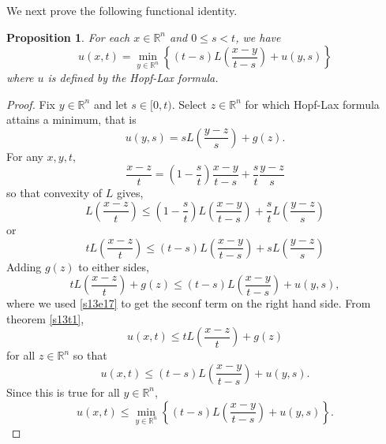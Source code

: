 \documentclass{article}
\theoremstyle{plain}
\numberwithin{thm}{section}
\theoremstyle{plain}
\newtheorem{prop}{Proposition}
\numberwithin{prop}{section}
\theoremstyle{definition}
\numberwithin{defn}{section}
\theoremstyle{remark}
\numberwithin{equation}{section}
\begin{document}
\noindent We next prove the following functional identity.
\begin{prop}\label{s13p6}
For each $x \in \mathbb{R}^n$ and $0 \le s < t$, we have
\[
u(x, t) = \min_{y \in \mathbb{R}^n}\left\{(t - s)L\left(\frac{x - y}{t - s}\right) + u(y, s)\right\}
\]
where $u$ is defined by the Hopf-Lax formula.
\end{prop}
\begin{proof}
Fix $y \in \mathbb{R}^n$ and let $s \in [0, t)$. Select $z \in \mathbb{R}^n$ for which Hopf-Lax
formula attains a minimum, that is
\begin{equation}\label{s13e18}
u(y, s) = sL\left(\frac{y - z}{s}\right) + g(z).
\end{equation}
For any $x, y, t$,
\[
\frac{x - z}{t} = \left(1 - \frac{s}{t}\right)\frac{x - y}{t - s} + \frac{s}{t}\frac{y - z}{s}
\]
so that convexity of $L$ gives,
\[
L\left(\frac{x - z}{t}\right) \le \left(1 - \frac{s}{t}\right)L\left(\frac{x - y}{t - s}\right)
+ \frac{s}{t}L\left(\frac{y - z}{s}\right)
\]
or
\[
tL\left(\frac{x - z}{t}\right) \le (t - s)L\left(\frac{x - y}{t - s}\right) + 
sL\left(\frac{y - z}{s}\right)
\]
Adding $g(z)$ to either sides,
\[
tL\left(\frac{x - z}{t}\right) + g(z) \le (t - s)L\left(\frac{x - y}{t - s}\right) + u(y, s),
\]
where we used \eqref{s13e17} to get the seconf term on the right hand side. From theorem \ref{s13t1},
\[
u(x, t) \le tL\left(\frac{x - z}{t}\right) + g(z)
\]
for all $z \in \mathbb{R}^n$ so that
\[
u(x, t) \le  (t - s)L\left(\frac{x - y}{t - s}\right) + u(y, s).
\]
Since this is true for all $y \in \mathbb{R}^n$, 
\begin{equation}\label{s13e19}
u(x, t) \le 
\min_{y \in \mathbb{R}^n}\left\{(t - s)L\left(\frac{x - y}{t - s}\right) + u(y, s)\right\}.
\end{equation}


\end{proof}
\end{document}
